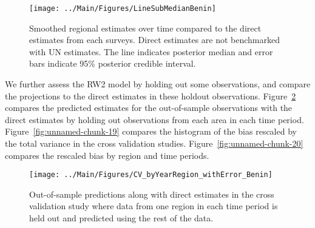 \documentclass[12pt]{article}\usepackage[]{graphicx}\usepackage[]{color}
\newenvironment{knitrout}{}{} %
\begin{document}
\begin{knitrout}
\color{fgcolor}\begin{figure}[bht]

{\centering \texttt{[image: ../Main/Figures/LineSubMedianBenin]} 

}

\caption[Smoothed regional estimates over time compared to the direct estimates from each surveys]{Smoothed regional estimates over time compared to the direct estimates from each surveys. Direct estimates are not benchmarked with UN estimates. The line indicates posterior median and error bars indicate 95\% posterior credible interval.}\label{fig:unnamed-chunk-17}
\end{figure}


\end{knitrout}
We further assess the RW2 model by holding out some observations, and compare the projections to the direct estimates in these holdout observations. Figure~\ref{fig:unnamed-chunk-18} compares the predicted estimates for the out-of-sample observations  with the direct estimates by holding out observations from each area in each time period.  Figure~\ref{fig:unnamed-chunk-19} compares the histogram of the bias rescaled by the total variance in the cross validation studies. Figure~\ref{fig:unnamed-chunk-20} compares the rescaled bias by region and time periods.



 
\begin{knitrout}
\color{fgcolor}\begin{figure}[bht]

{\centering \texttt{[image: ../Main/Figures/CV\_byYearRegion\_withError\_Benin]} 

}

\caption[Out-of-sample predictions along with direct estimates in the cross validation study where data from one region in each time period is held out and predicted using the rest of the data]{Out-of-sample predictions along with direct estimates in the cross validation study where data from one region in each time period is held out and predicted using the rest of the data.}\label{fig:unnamed-chunk-18}
\end{figure}


\end{knitrout}
\end{document}

